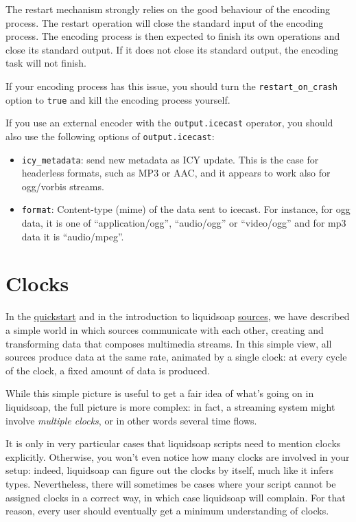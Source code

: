 The restart mechanism strongly relies on the good behaviour of the encoding process. The restart operation will 
close the standard input of the encoding process. The encoding process is then expected to finish its own operations and
close its standard output. If it does not close its standard output, the encoding task will not finish. 

If your encoding process has this issue, you should turn the \verb+restart_on_crash+ option to \verb+true+ and kill the encoding
process yourself.

If you use an external encoder with the \verb+output.icecast+ operator,
you should also use the following options of \verb+output.icecast+:

\begin{itemize}
\item \verb+icy_metadata+: send new metadata as ICY update. This is the case for headerless formats, such as MP3 or AAC, and it appears to work also for ogg/vorbis streams.
\item \verb+format+: Content-type (mime) of the data sent to icecast. For instance, for ogg data, it is one of ``application/ogg'', ``audio/ogg'' or ``video/ogg'' and for mp3 data it is ``audio/mpeg''.

\end{itemize}

\section{Clocks}
In the \href{quick_start.html}{quickstart} and in the introduction to liquidsoap
\href{sources.html}{sources}, we have described a simple world in which sources
communicate with each other, creating and transforming data that
composes multimedia streams.
In this simple view, all sources produce data at the same rate,
animated by a single clock: at every cycle of the clock,
a fixed amount of data is produced.

While this simple picture is useful to get a fair idea of what's going on
in liquidsoap, the full picture is more complex: in fact, a streaming
system might involve \emph{multiple clocks}, or in other words several
time flows.

It is only in very particular cases that liquidsoap scripts
need to mention clocks explicitly. Otherwise, you won't even notice
how many clocks are involved in your setup: indeed, liquidsoap can figure
out the clocks by itself, much like it infers types.
Nevertheless, there will sometimes be cases where your script cannot
be assigned clocks in a correct way, in which case liquidsoap will
complain. For that reason, every user should eventually get a minimum
understanding of clocks.

